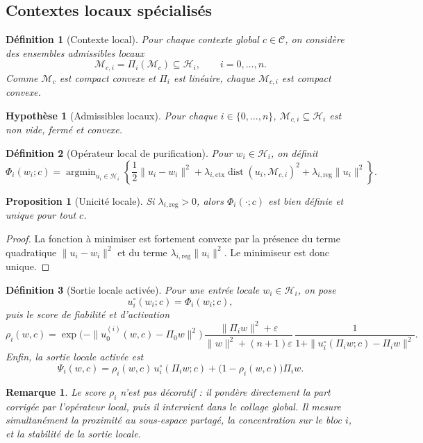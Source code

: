 \documentclass[11pt,a4paper]{article}
\newtheorem{definition}{Définition}[section]
\newtheorem{assumption}{Hypothèse}[section]
\newtheorem{proposition}{Proposition}[section]
\newtheorem{remark}{Remarque}[section]
\DeclareMathOperator{\argmin}{argmin}
\DeclareMathOperator{\dist}{dist}
\newcommand{\C}{\mathcal C}
\newcommand{\Hh}{\mathcal H}
\newcommand{\Mcal}{\mathcal M}
\newcommand{\1}{\mathbf 1}
\begin{document}
\subsection{Contextes locaux spécialisés}

\begin{definition}[Contexte local]
Pour chaque contexte global \(c\in\C\), on considère des ensembles admissibles locaux
\[
\Mcal_{c,i}=\Pi_i(\Mcal_c)\subseteq \Hh_i,
\qquad i=0,\dots,n.
\]
Comme \(\Mcal_c\) est compact convexe et \(\Pi_i\) est linéaire, chaque \(\Mcal_{c,i}\) est compact convexe.
\end{definition}

\begin{assumption}[Admissibles locaux]
Pour chaque \(i\in\{0,\dots,n\}\), \(\Mcal_{c,i}\subseteq \Hh_i\) est non vide, fermé et convexe.
\end{assumption}

\begin{definition}[Opérateur local de purification]
Pour \(w_i\in\Hh_i\), on définit
\[
\Phi_i(w_i;c)
=
\argmin_{u_i\in\Hh_i}
\left\{
\frac12\|u_i-w_i\|^2
+
\lambda_{i,\mathrm{ctx}}\dist(u_i,\Mcal_{c,i})^2
+
\lambda_{i,\mathrm{reg}}\|u_i\|^2
\right\}.
\]
\end{definition}

\begin{proposition}[Unicité locale]
Si \(\lambda_{i,\mathrm{reg}}>0\), alors \(\Phi_i(\cdot;c)\) est bien définie et unique pour tout \(c\).
\end{proposition}

\begin{proof}
La fonction à minimiser est fortement convexe par la présence du terme quadratique \(\|u_i-w_i\|^2\) et du terme \(\lambda_{i,\mathrm{reg}}\|u_i\|^2\).  
Le minimiseur est donc unique.
\end{proof}

\begin{definition}[Sortie locale activée]
Pour une entrée locale \(w_i\in\Hh_i\), on pose
\[
u_i^\circ(w_i;c)=\Phi_i(w_i;c),
\]
puis le score de fiabilité et d'activation
\[
\rho_i(w,c)
=
\exp\!\bigl(-\|u_0^{(i)}(w,c)-\Pi_0 w\|^2\bigr)\,
\frac{\|\Pi_i w\|^2+\varepsilon}{\|w\|^2+(n+1)\varepsilon}\,
\frac{1}{1+\|u_i^\circ(\Pi_i w;c)-\Pi_i w\|^2}.
\]
Enfin, la sortie locale activée est
\[
\Psi_i(w,c)
=
\rho_i(w,c)\,u_i^\circ(\Pi_i w;c)
+
\bigl(1-\rho_i(w,c)\bigr)\Pi_i w.
\]
\end{definition}

\begin{remark}
Le score \(\rho_i\) n'est pas décoratif : il pondère directement la part corrigée par l'opérateur local, puis il intervient dans le collage global.  
Il mesure simultanément la proximité au sous-espace partagé, la concentration sur le bloc \(i\), et la stabilité de la sortie locale.
\end{remark}
\end{document}
